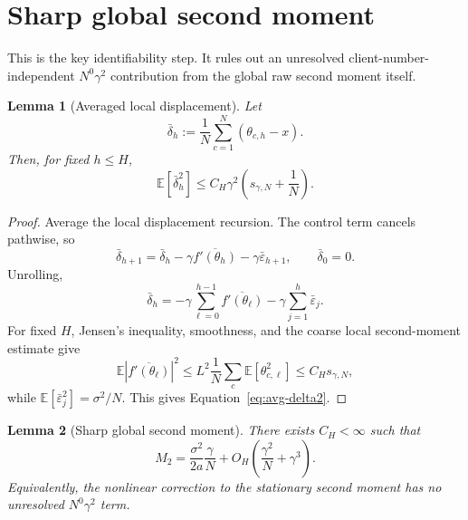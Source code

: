 \documentclass[11pt]{article}
\newtheorem{lemma}[lemma]{Lemma}
\theoremstyle{definition}
\newcommand{\E}{\mathbb{E}}
\newcommand{\smallscale}{s_{\gamma,N}}
\newcommand{\eps}{\varepsilon}
\newcommand{\delt}{\delta}
\begin{document}
\section{Sharp global second moment}
\label{sec:sharpM2}

This is the key identifiability step. It rules out an unresolved client-number-independent $N^0\gamma^2$ contribution from the global raw second moment itself.

\begin{lemma}[Averaged local displacement]
\label{lem:avg-delta}
Let
\[
  \bar\delt_h:=\frac1N\sum_{c=1}^N(\theta_{c,h}-x).
\]
Then, for fixed $h\le H$,
\begin{equation}
\label{eq:avg-delta2}
  \E[\bar\delt_h^2]
  \le C_H\gamma^2\left(\smallscale+\frac1N\right).
\end{equation}
\end{lemma}

\begin{proof}
Average the local displacement recursion. The control term cancels pathwise, so
\[
  \bar\delt_{h+1}
  =\bar\delt_h-\gamma\overline{f'(\theta_h)}-\gamma\bar\eps_{h+1},
  \qquad \bar\delt_0=0.
\]
Unrolling,
\[
  \bar\delt_h=-\gamma\sum_{\ell=0}^{h-1}\overline{f'(\theta_\ell)}
  -\gamma\sum_{j=1}^h\bar\eps_j.
\]
For fixed $H$, Jensen's inequality, smoothness, and the coarse local second-moment estimate give
\[
  \E|\overline{f'(\theta_\ell)}|^2
  \le L^2\frac1N\sum_c\E[\theta_{c,\ell}^2]
  \le C_H\smallscale,
\]
while $\E[\bar\eps_j^2]=\sigma^2/N$. This gives Equation~\eqref{eq:avg-delta2}.
\end{proof}

\begin{lemma}[Sharp global second moment]
\label{lem:G5b}
There exists $C_H<\infty$ such that
\begin{equation}
\label{eq:G5b}
  M_2
  =\frac{\sigma^2}{2a}\frac{\gamma}{N}
  +O_H\left(\frac{\gamma^2}{N}+\gamma^3\right).
\end{equation}
Equivalently, the nonlinear correction to the stationary second moment has no unresolved $N^0\gamma^2$ term.
\end{lemma}
\end{document}
